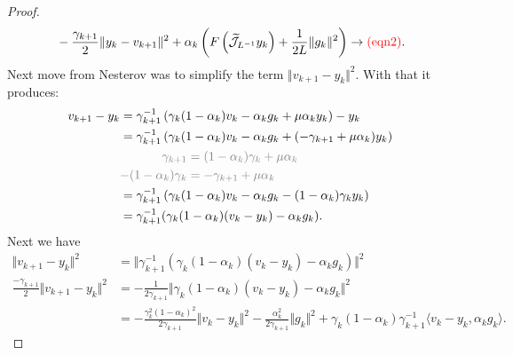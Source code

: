 \documentclass[12pt]{article}
\begin{document}
\begin{proof}
\begin{align*}
            & \quad 
            - \frac{\gamma_{k + 1}}{2}\Vert y_k - v_{k + 1}\Vert^2 
            + 
            \alpha_k\left(
                F\left(\widetilde{\mathcal J}_{L^{-1}} y_k\right) 
                + 
                \frac{1}{2L} \Vert g_k\Vert^2
            \right)
            \rightarrow 
            \textcolor{red}{(\text{eqn2})}. 
        \end{align*}
        Next move from Nesterov was to simplify the term $\Vert v_{k + 1} - y_k\Vert^2$. 
        With that it produces: 
        \begin{align*}
            v_{k + 1} - y_k 
            &= 
            \gamma_{k + 1}^{-1}
            \left(
                \gamma_k(1 - \alpha_k) v_k - \alpha_k g_k + \mu \alpha_k y_k
            \right) - y_k
            \\
            &= 
            \gamma_{k + 1}^{-1}
            \left(
                \gamma_k(1 - \alpha_k)v_k - \alpha_k g_k 
                + (-\gamma_{k + 1} + \mu\alpha_k)y_k
            \right)
            \\
            &
            \textcolor{gray}{
                \begin{aligned}
                    \gamma_{k + 1} &=    
                    (1 - \alpha_k)\gamma_k + \mu \alpha_k
                    \\
                    -(1 - \alpha_k)\gamma_k
                    &= - \gamma_{k + 1} + \mu \alpha_k
                \end{aligned}
            }
            \\
            &=
            \gamma_{k + 1}^{-1}
            \left(
                \gamma_k(1 - \alpha_k)v_k - \alpha_k g_k - 
                (1 - \alpha_k)\gamma_ky_k
            \right)
            \\
            &= 
            \gamma_{k + 1}^{-1}(
                \gamma_k(1 - \alpha_k)(v_k - y_k) 
                - \alpha_k g_k
            ).
        \end{align*}
        Next we have
        {\small
        \begin{align*}
            \Vert v_{k + 1} - y_k\Vert^2 
            &= 
            \Vert 
                \gamma_{k + 1}^{-1}(
                    \gamma_k(1 - \alpha_k)(v_k - y_k) 
                    - \alpha_k g_k
                )
            \Vert^2
            \\
            \frac{- \gamma_{k + 1}}{2}
            \Vert v_{k + 1} - y_k\Vert^2
            &= 
            - \frac{1}{2\gamma_{k + 1}}
            \Vert 
                \gamma_k(1 - \alpha_k)(v_k - y_k) - \alpha_k g_k
            \Vert^2
            \\
            &= 
            -\frac{\gamma_k^2 (1 - \alpha_k)^2}{2 \gamma_{k + 1}} 
            \Vert v_k - y_k\Vert^2 - 
            \frac{\alpha_k^2}{2 \gamma_{k + 1}} \Vert g_k\Vert^2
            + 
            \gamma_k(1 - \alpha_k)\gamma_{k + 1}^{-1} \langle v_k - y_k, \alpha_k g_k\rangle. 
        \end{align*}
        }


\end{proof}
\end{document}
